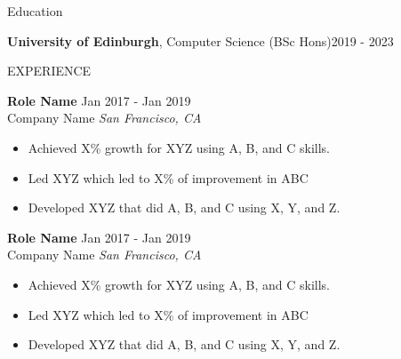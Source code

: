 \documentclass{resume} %
\begin{document}

\begin{rSection}{Education}

{\bf  University of Edinburgh}, Computer Science (BSc Hons)\hfill {2019 - 2023}

\end{rSection}


\begin{rSection}{EXPERIENCE}

    \textbf{Role Name} \hfill Jan 2017 - Jan 2019\\
    Company Name \hfill \textit{San Francisco, CA}
     \begin{itemize}
        \itemsep -3pt {} 
         \item Achieved X\% growth for XYZ using A, B, and C skills.
         \item Led XYZ which led to X\% of improvement in ABC
        \item Developed XYZ that did A, B, and C using X, Y, and Z. 
     \end{itemize}
     
    \textbf{Role Name} \hfill Jan 2017 - Jan 2019\\
    Company Name \hfill \textit{San Francisco, CA}
     \begin{itemize}
        \itemsep -3pt {} 
         \item Achieved X\% growth for XYZ using A, B, and C skills.
         \item Led XYZ which led to X\% of improvement in ABC
        \item Developed XYZ that did A, B, and C using X, Y, and Z. 
     \end{itemize}
    
    \end{rSection} 


\end{document}
